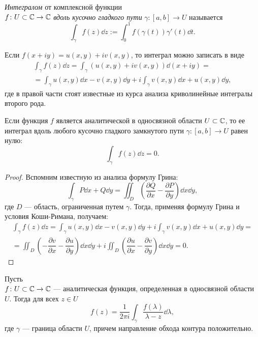 \begin{definition}
    \emph{Интегралом} от комплексной функции \\$f \colon U \subset \mathbb{C} \to \mathbb{C}$ \emph{вдоль
        кусочно гладкого пути} $\gamma \colon [a, b] \to U$ называется 
    \[ \int_\gamma f(z) \dd z := \int_0^1 f(\gamma(t)) \gamma'(t) \dd t. \]
\end{definition}

Если $f(x + i y) = u(x, y) + i v(x, y)$, то интеграл можно записать в виде
\begin{multline*}
 \int_\gamma f(z) \dd z = \int_\gamma (u(x, y) + i v(x, y)) \dd (x + i y) =\\ = 
   \int_\gamma u(x, y) \dd x - v(x, y) \dd y + i \int_\gamma v(x, y) \dd x + u(x, y) \dd y, 
\end{multline*}
где в правой части стоят известные из курса анализа криволинейные интегралы второго рода.

\begin{theorem}[Коши]
    Если функция $f$ является аналитической в односвязной области $U \subset \mathbb{C}$,
    то ее интеграл вдоль любого кусочно гладкого замкнутого 
    пути $\gamma \colon [a, b] \to U$ равен нулю:
    \[ \int_{\gamma} f(z) \dd z = 0. \]
\end{theorem}

\begin{proof}
    Вспомним известную из анализа формулу Грина:
    \[ \int_\gamma P \dd x + Q \dd y = \iint_D \left(\dfrac{\partial Q}{\partial x} - \dfrac{\partial P}{\partial y}\right) \dd x \dd y, \]
    где $D$ --- область, ограниченная путем $\gamma$.
    Тогда, применяя формулу Грина и условия Коши-Римана, получаем:
    \begin{multline*}
     \int_\gamma f(z) \dd z =  
       \int_\gamma u(x, y) \dd x - v(x, y) \dd y + i \int_\gamma v(x, y) \dd x + u(x, y) \dd y = \\ = \iint_D \left(-\dfrac{\partial v}{\partial x} - \dfrac{\partial u}{\partial y}\right) \dd x \dd y + i \iint_D \left(\dfrac{\partial u}{\partial x} - \dfrac{\partial v}{\partial y}\right) \dd x \dd y = 0.
    \end{multline*}
\end{proof}

\begin{theorem}\label{th:cauchy_formula}
    Пусть \\$f \colon U \subset \mathbb{C} \to \mathbb{C}$ --- аналитическая функция, определенная
    в односвязной области $U$. Тогда для всех $z \in U$
    \[ f(z) = \frac{1}{2 \pi i} \int_\gamma \frac{f(\lambda)}{\lambda - z} \dd \lambda, \]
    где $\gamma$ --- граница области $U$, причем направление обхода контура положительно.
\end{theorem}

